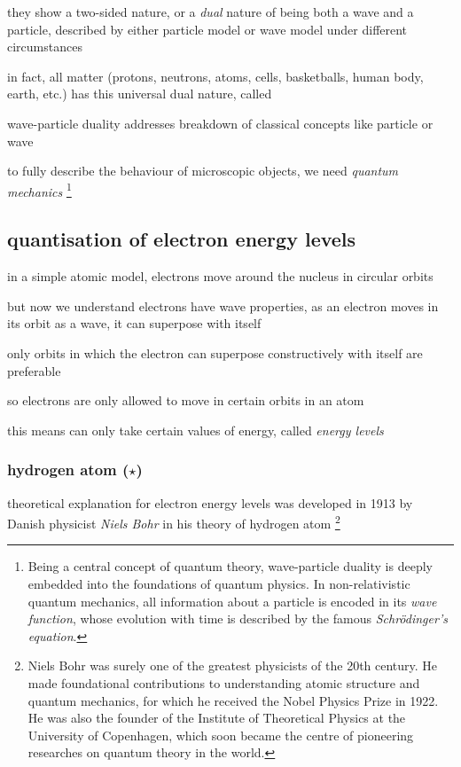they show a two-sided nature, or a \emph{dual} nature of being both a wave and a particle, described by either particle model or wave model under different circumstances

in fact, all matter (protons, neutrons, atoms, cells, basketballs, human body, earth, etc.) has this universal dual nature, called 

wave-particle duality addresses breakdown of classical concepts like particle or wave

to fully describe the behaviour of microscopic objects, we need \emph{quantum mechanics}
\footnote{Being a central concept of quantum theory, wave-particle duality is deeply embedded into the foundations of quantum physics. In non-relativistic quantum mechanics, all information about a particle is encoded in its \emph{wave function}, whose evolution with time is described by the famous \emph{Schr\"odinger's equation}.}




\subsection{quantisation of electron energy levels}

in a simple atomic model, electrons move around the nucleus in circular orbits

but now we understand electrons have wave properties, as an electron moves in its orbit as a wave, it can superpose with itself

only orbits in which the electron can superpose constructively with itself are preferable

so electrons are only allowed to move in certain orbits in an atom

this means can only take certain values of energy, called \emph{energy levels}



\subsubsection{hydrogen atom \protect($\star$)}

theoretical explanation for electron energy levels was developed in 1913 by Danish physicist \emph{Niels Bohr} in his theory of hydrogen atom
\footnote{Niels Bohr was surely one of the greatest physicists of the 20th century. He made foundational contributions to understanding atomic structure and quantum mechanics, for which he received the Nobel Physics Prize in 1922. He was also the founder of the Institute of Theoretical Physics at the University of Copenhagen, which soon became the centre of pioneering researches on quantum theory in the world.}

